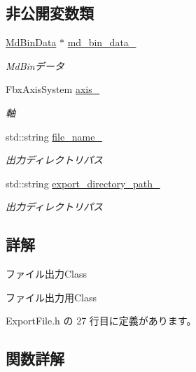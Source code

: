 \subsection*{非公開変数類}
\begin{DoxyCompactItemize}
\item 
\mbox{\hyperlink{class_md_bin_data}{Md\+Bin\+Data}} $\ast$ \mbox{\hyperlink{class_export_file_a21c28c8b20e7c7592c9b31e4f316e446}{md\+\_\+bin\+\_\+data\+\_\+}}
\begin{DoxyCompactList}\small\item\em Md\+Binデータ \end{DoxyCompactList}\item 
Fbx\+Axis\+System \mbox{\hyperlink{class_export_file_aa07d09fbe2283f5b69a3d001ce6bcc4c}{axis\+\_\+}}
\begin{DoxyCompactList}\small\item\em 軸 \end{DoxyCompactList}\item 
std\+::string \mbox{\hyperlink{class_export_file_a7b71765d0ac88a9e284a79e8fbbe4d4e}{file\+\_\+name\+\_\+}}
\begin{DoxyCompactList}\small\item\em 出力ディレクトリパス \end{DoxyCompactList}\item 
std\+::string \mbox{\hyperlink{class_export_file_ad61be755d6178b9f7f452f0e45343e02}{export\+\_\+directory\+\_\+path\+\_\+}}
\begin{DoxyCompactList}\small\item\em 出力ディレクトリパス \end{DoxyCompactList}\end{DoxyCompactItemize}


\subsection{詳解}
ファイル出力\+Class 

ファイル出力用\+Class 

 Export\+File.\+h の 27 行目に定義があります。



\subsection{関数詳解}
\mbox{\label{class_export_file_ad171b58b3ee1f84ed22a60afe55f4096}} 
